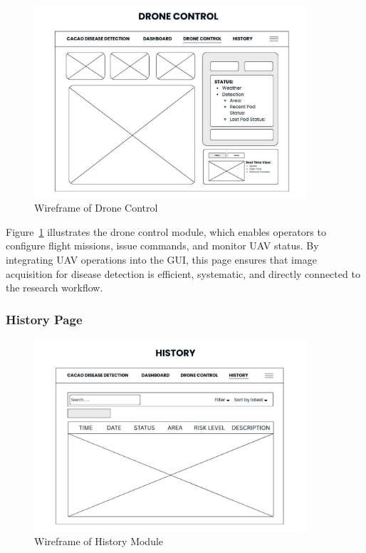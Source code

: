 \begin{figure}[H]
	\centering
	\caption{Wireframe of Drone Control}
	\label{fig:DroneControlGUI}
	\includegraphics[width=0.9\textwidth]{figures/Drone Control.pdf}
\end{figure}

Figure~\ref{fig:DroneControlGUI} illustrates the drone control module, which enables operators to configure flight missions, issue commands, and monitor UAV status. By integrating UAV operations into the GUI, this page ensures that image acquisition for disease detection is efficient, systematic, and directly connected to the research workflow.

\subsubsection*{History Page}

\begin{figure}[H]
	\centering
	\caption{Wireframe of History Module}
	\label{fig:HistoryGUI}
	\includegraphics[width=0.9\textwidth]{figures/History.pdf}
\end{figure}

